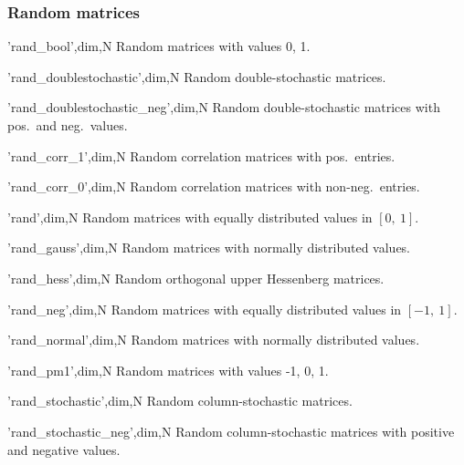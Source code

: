 \subsubsection{Random matrices}
\begin{param}

\item['rand\_bool',dim,N] Random matrices with values 0, 1.
\item['rand\_doublestochastic',dim,N] Random double-stochastic matrices.
\item['rand\_doublestochastic\_neg',dim,N] Random double-stochastic matrices with pos.\ and neg.\ values.
\item['rand\_corr\_1',dim,N] Random correlation matrices with pos.\ entries.
\item['rand\_corr\_0',dim,N] Random correlation matrices with non-neg.\ entries.
\item['rand',dim,N] Random matrices with equally distributed values in $[0,\ 1]$.
\item['rand\_gauss',dim,N] Random matrices with normally distributed values.
\item['rand\_hess',dim,N] Random orthogonal upper Hessenberg matrices.
\item['rand\_neg',dim,N] Random matrices with equally distributed values in $[-1,\ 1]$.
\item['rand\_normal',dim,N] Random matrices with normally distributed values.
\item['rand\_pm1',dim,N] Random matrices with values -1, 0, 1.%
\item['rand\_stochastic',dim,N] Random column-stochastic matrices.
\item['rand\_stochastic\_neg',dim,N] Random column-stochastic matrices with positive and negative values.

\end{param}
